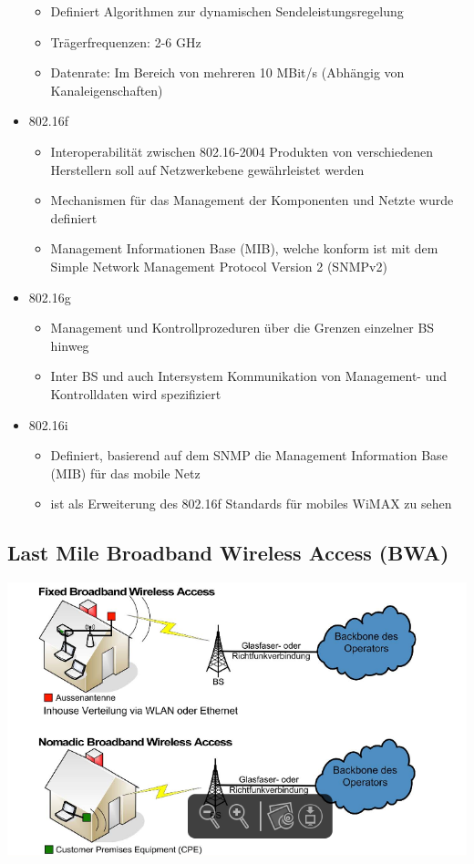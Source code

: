 \begin{itemize}
\begin{itemize}
\item Definiert Algorithmen zur dynamischen Sendeleistungsregelung
\item Trägerfrequenzen: 2-6 GHz
\item Datenrate: Im Bereich von mehreren 10 MBit/s (Abhängig von Kanaleigenschaften)
\end{itemize}
\item 802.16f
\begin{itemize}
\item Interoperabilität zwischen 802.16-2004 Produkten von verschiedenen Herstellern soll auf Netzwerkebene gewährleistet werden
\item Mechanismen für das Management der Komponenten und Netzte wurde definiert
\item Management Informationen Base (MIB), welche konform ist mit dem Simple Network Management Protocol Version 2 (SNMPv2)
\end{itemize}
\item 802.16g
\begin{itemize}
\item Management und Kontrollprozeduren über die Grenzen einzelner BS hinweg
\item Inter BS und auch Intersystem Kommunikation von Management- und Kontrolldaten wird spezifiziert
\end{itemize}
\item 802.16i 
\begin{itemize}
\item Definiert, basierend auf dem SNMP die Management Information Base (MIB) für das mobile Netz
\item ist als Erweiterung des 802.16f Standards für mobiles WiMAX zu sehen
\end{itemize}
\end{itemize}
\subsection{Last Mile Broadband Wireless Access (BWA)}
\includegraphics[width = 0.75 \linewidth]{./pics/wimax3.png} 
